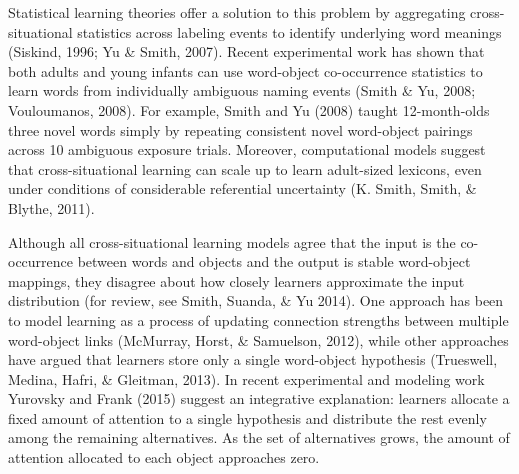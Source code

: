 \documentclass[oneside]{report}
\begin{document}
Statistical learning theories offer a solution to this problem by
aggregating cross-situational statistics across labeling events to
identify underlying word meanings (Siskind, 1996; Yu \& Smith, 2007).
Recent experimental work has shown that both adults and young infants
can use word-object co-occurrence statistics to learn words from
individually ambiguous naming events (Smith \& Yu, 2008; Vouloumanos,
2008). For example, Smith and Yu (2008) taught 12-month-olds three novel
words simply by repeating consistent novel word-object pairings across
10 ambiguous exposure trials. Moreover, computational models suggest
that cross-situational learning can scale up to learn adult-sized
lexicons, even under conditions of considerable referential uncertainty
(K. Smith, Smith, \& Blythe, 2011).

Although all cross-situational learning models agree that the input is
the co-occurrence between words and objects and the output is stable
word-object mappings, they disagree about how closely learners
approximate the input distribution (for review, see Smith, Suanda, \& Yu
2014). One approach has been to model learning as a process of updating
connection strengths between multiple word-object links (McMurray,
Horst, \& Samuelson, 2012), while other approaches have argued that
learners store only a single word-object hypothesis (Trueswell, Medina,
Hafri, \& Gleitman, 2013). In recent experimental and modeling work
Yurovsky and Frank (2015) suggest an integrative explanation: learners
allocate a fixed amount of attention to a single hypothesis and
distribute the rest evenly among the remaining alternatives. As the set
of alternatives grows, the amount of attention allocated to each object
approaches zero.
\end{document}
